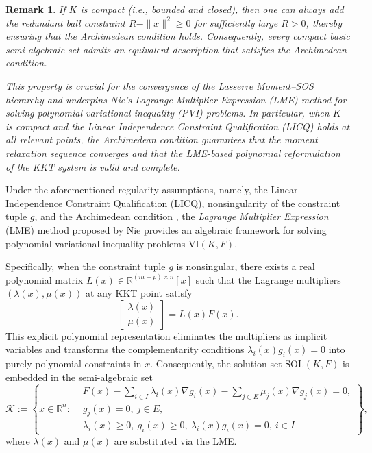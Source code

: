 \documentclass[sn-basic,Numbered]{sn-jnl}
\newcommand{\SOL}{\mathrm{SOL}}
\newcommand{\VI}{\mathrm{VI}}
\theoremstyle{thmstyleone}%
\newtheorem{remark}{Remark}%
\begin{document}
\begin{remark}
If $K$ is \emph{compact} (i.e., bounded and closed), then one can always add the redundant ball constraint $R - \|x\|^2 \geq 0$ for sufficiently large $R > 0$, thereby ensuring that the Archimedean condition holds. Consequently, every compact basic semi-algebraic set admits an equivalent description that satisfies the Archimedean condition.

This property is crucial for the convergence of the Lasserre Moment--SOS hierarchy and underpins Nie's Lagrange Multiplier Expression (LME) method for solving polynomial variational inequality (PVI) problems. In particular, when $K$ is compact and the Linear Independence Constraint Qualification (LICQ) holds at all relevant points, the Archimedean condition guarantees that the moment relaxation sequence converges and that the LME-based polynomial reformulation of the KKT system is valid and complete.
\end{remark}


Under the aforementioned regularity assumptions, namely, the Linear Independence Constraint Qualification (LICQ), nonsingularity of the constraint tuple $g$, and the Archimedean condition , the \emph{Lagrange Multiplier Expression} (LME) method proposed by Nie provides an algebraic framework for solving polynomial variational inequality problems $\VI(K, F)$.

Specifically, when the constraint tuple $g$ is nonsingular, there exists a real polynomial matrix $L(x) \in \mathbb{R}^{(m+p) \times n}[x]$ such that the Lagrange multipliers $(\lambda(x), \mu(x))$ at any KKT point satisfy
\[
\begin{bmatrix}
\lambda(x) \\ \mu(x)
\end{bmatrix}
= L(x) F(x).
\]
This explicit polynomial representation eliminates the multipliers as implicit variables and transforms the complementarity conditions $\lambda_i(x) g_i(x) = 0$ into purely polynomial constraints in $x$. Consequently, the solution set $\SOL(K, F)$ is embedded in the semi-algebraic set
\[
\mathcal{K} := \left\{ x \in \mathbb{R}^n :
\begin{aligned}
& F(x) - \sum_{i \in I} \lambda_i(x) \nabla g_i(x) - \sum_{j \in E} \mu_j(x) \nabla g_j(x) = 0, \\
& g_j(x) = 0,\ j \in E, \\
& \lambda_i(x) \geq 0,\ g_i(x) \geq 0,\ \lambda_i(x) g_i(x) = 0,\ i \in I
\end{aligned}
\right\},
\]
where $\lambda(x)$ and $\mu(x)$ are substituted via the LME.
\end{document}
